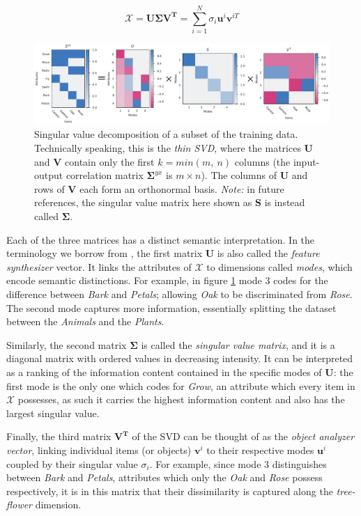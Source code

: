 \documentclass[11pt]{article}
\theoremstyle{remark}
\begin{document}
\begin{equation}
  \bm{\mathcal{X}} = \bm{U}\bm{\Sigma}\bm{V^T} = \sum_{i=1}^N \sigma_i\bm{u}^i\bm{v}^{iT}
\end{equation}

\begin{figure}
  \centering
  \includegraphics[width=\linewidth]{svd_new_FINAL.pdf}
  \caption{Singular value decomposition of a subset of the training data. Technically speaking, this is the \textit{thin SVD}, where the matrices $\bm{U}$ and $\bm{V}$ contain only the first $k = min(m,\ n)$ columns (the input-output correlation matrix $\bm{\Sigma}^{yx}$ is $m\times n$). The columns of $\bm{U}$ and rows of $\bm{V}$ each form an orthonormal basis. \textit{Note:} in future references, the singular value matrix here shown as $\bm{S}$ is instead called $\bm{\Sigma}$.}
  \label{fig:svd}
\end{figure}

\noindent Each of the three matrices has a distinct semantic interpretation. In the terminology we borrow from \cite{saxe2019a}, the first matrix $\bm{U}$ is also called the \textit{feature synthesizer} vector. It links the attributes of $\mathcal{X}$ to dimensions called \textit{modes}, which encode semantic distinctions. For example, in figure \ref{fig:svd} mode 3 codes for the difference between \textit{Bark} and \textit{Petals}; allowing \textit{Oak} to be discriminated from \textit{Rose}. The second mode captures more information, essentially splitting the dataset between the \textit{Animals} and the \textit{Plants}.

Similarly, the second matrix $\bm{\Sigma}$ is called the \textit{singular value matrix}, and it is a diagonal matrix with ordered values in decreasing intensity. It can be interpreted as a ranking of the information content contained in the specific modes of $\bm{U}$: the first mode is the only one which codes for \textit{Grow}, an attribute which every item in $\mathcal{X}$ possesses, as such it carries the highest information content and also has the largest singular value.

Finally, the third matrix $\bm{V^T}$ of the SVD can be thought of as the \textit{object analyzer vector}, linking individual items (or objects) $\bm{v}^i$ to their respective modes $\bm{u}^i$ coupled by their singular value $\sigma_i$. For example, since mode 3 distinguishes between \textit{Bark} and \textit{Petals}, attributes which only the \textit{Oak} and \textit{Rose} possess respectively, it is in this matrix that their dissimilarity is captured along the \textit{tree-flower} dimension.
\end{document}
